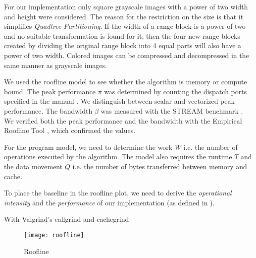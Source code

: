  For our implementation only square grayscale images with a power
of two width and height were considered. The reason for the restriction on the
size is that it simplifies \textit{Quadtree Partitioning}. If the width of a
range block is a power of two and no suitable transformation is found for it,
then the four new range blocks created by dividing the original range block into
4 equal parts will also have a power of two width. Colored images can be
compressed and decompressed in the same manner as grayscale images.


 We used the roofline model \cite{applying-roofline} to see whether the algorithm is memory or
compute bound. The peak performance $\pi$ was determined by counting the dispatch
ports specified in the manual \cite{intel-opt-manual}. We distinguish between scalar and vectorized peak
performance. The bandwidth $\beta$ was measured with the STREAM benchmark \cite{stream}. We verified both the peak
performance and the bandwidth with the Empirical Roofline Tool \cite{ert}, which confirmed the values.

For the program model, we need to determine the work $W$ i.e. the number of operations executed by the algorithm. The model also
requires the runtime $T$ and the data movement $Q$ i.e. the number of bytes transferred between memory and cache.


To place the baseline in the roofline plot, we need to derive the \textit{operational intensity} and the
\textit{performance} of our implementation (as defined in \cite{applying-roofline}).


 With Valgrind's callgrind and cachegrind


\begin{figure}
  \texttt{[image: roofline]}
  \caption{Roofline}
\end{figure}




